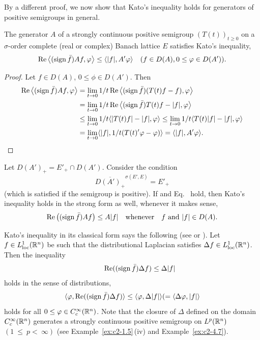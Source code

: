 By a different proof, we now show that Kato's inequality holds for generators of positive semigroups in general.
\begin{theorem}\label{thm:c2-2.4}
%
The generator $A$ of a strongly continuous positive semigroup $(T(t))_{t \geq 0}$ on a $\sigma$-order complete (real or complex) Banach lattice $E$ satisfies Kato's inequality, \ie
\begin{equation*}\label{eq:c2-K-2} %
\Re\left\langle(\sign \bar{f})Af,\phi \right\rangle \leq \langle |f|,A'\phi \rangle \quad (f \in D(A), 0 \leq \phi \in D(A')).
\end{equation*}
\end{theorem}
\begin{proof}
Let $f \in D(A)$, $0 \leq \phi \in D(A')$.
Then
\begin{align*}
\Re\left\langle(\sign \bar{f})Af, \phi \right\rangle 
	&= \lim_{t \to 0} 1/t \Re\left\langle(\sign \bar{f})(T(t)f - f), \phi \right\rangle \\
	&= \lim_{t \to 0} 1/t \Re\left\langle(\sign \bar{f})T(t)f - |f|, \phi \right\rangle \\
	&\leq \lim_{t \to 0} 1/t \langle |T(t)f| - |f|, \phi \rangle 
	\leq \lim_{t \to 0} 1/t \langle T(t)|f| - |f|, \phi \rangle\\
	&= \lim_{t \to 0} \langle |f|, 1/t(T(t)'\phi - \phi) \rangle
	= \langle |f|, A'\phi \rangle.
\tag*{\qedsymbol}%
\end{align*}
\let\qedsymbol\relax
\end{proof}
Let $D(A')_{+} = E'_{+} \cap D(A')$. 
Consider the condition
\begin{equation}\label{eq:c2-2.9}
\overline{D(A')_{+}}^{\sigma(E',E)} = E'_{+}
\end{equation}
(which is satisfied if the semigroup is positive). 
If    and Eq.~   hold, then Kato's inequality holds in the strong form as well, whenever it makes sense, \ie
\begin{equation}\label{eq:c2-2.10}
\Re\left((\sign \bar{f})Af \right) \leq A|f| \quad \text{whenever}\quad f \text{ and } |f| \in D(A) .
\end{equation}
\begin{example}\label{ex:c2-2.5}
%
Kato's inequality in its classical form says the following (see \textcite{kato:1973} or \textcite[X.27]{reedsimon:1975}).
Let $f \in L^1_{\text{loc}}(\mathbb{R}^n)$ be such that the distributional Laplacian satisfies $\Delta f \in L^1_{\text{loc}}(\mathbb{R}^n)$.
Then the inequality
\begin{equation*} \label{eq:c2-K-classic} \tag*{}
\Re((\sign \bar{f})\Delta f) \leq \Delta|f| 
\end{equation*}
holds in the sense of distributions, \ie
\[
\langle \phi, \Re((\sign \bar{f})\Delta f) \rangle \leq \langle \phi,\Delta|f| \rangle (= \langle \Delta \phi,|f| \rangle
\]
holds for all $0 \leq \phi \in C_{c}^{\infty}(\R^n)$.
Note that the closure of\/ $\Delta$ defined on the domain $C_{c}^{\infty}(\mathbb{R}^n)$ generates a strongly continuous positive semigroup on $L^p(\mathbb{R}^n)$ $(1~\leq~p <~\infty)$ (see Example~\ref{ex:c2-1.5}\,(iv) and Example~\ref{ex:c2-4.7}).
\end{example}
